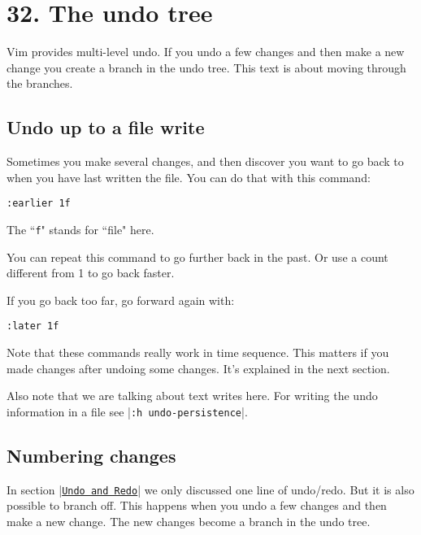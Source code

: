 \section{32. The undo tree}
Vim provides multi-level undo.
If you undo a few changes and then make a new change you create a branch in the undo tree.
This text is about moving through the branches.
\localtableofcontents
\subsection{Undo up to a file write}
Sometimes you make several changes, and then discover you want to go back to when you have last written the file.
You can do that with this command:

\begin{Verbatim}[samepage=true]
 :earlier 1f
\end{Verbatim}

The ``\texttt{f}" stands for ``file" here.

You can repeat this command to go further back in the past.
Or use a count different from 1 to go back faster.

If you go back too far, go forward again with:

\begin{Verbatim}[samepage=true]
 :later 1f
\end{Verbatim}

Note that these commands really work in time sequence.
This matters if you made changes after undoing some changes.
It's explained in the next section.

Also note that we are talking about text writes here.
For writing the undo information in a file see |\texttt{:h undo-persistence}|.
\subsection{Numbering changes}
\label{Numbering changes}
In section |\hyperref[Undo and Redo]{\texttt{Undo and Redo}}| we only discussed one line of undo/redo.
But it is also possible to branch off.
This happens when you undo a few changes and then make a new change.
The new changes become a branch in the undo tree.

